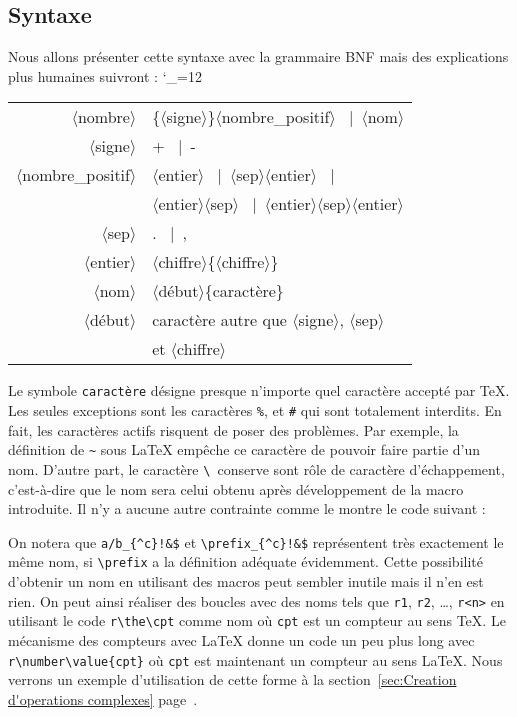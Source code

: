 \documentclass[12pt]{report}
\makeatletter
\newenvironment{syntaxBNF}{%
  \catcode`\_=12
  \def\*##1*{$\langle$##1$\rangle$}%
  \def\alt{\unskip~$|$~\ignorespaces}%
  \def\sameline{\multicolumn{1}{c}{} & \null\quad}%
  \ttfamily
  \begin{center}\begin{tabular}{r@{\quad:=\quad}l}}
{\end{tabular}\end{center}}
\makeatother
\begin{document}
\subsection{Syntaxe}
\label{subsec:Syntaxe}
Nous allons présenter cette syntaxe avec la grammaire BNF mais des
explications plus humaines suivront :
\begin{syntaxBNF}
  \*nombre* & \{\*signe*\}\*nombre_positif* \alt \*nom* \\
  \*signe* & + \alt - \\
  \*nombre_positif* & \*entier* \alt \*sep*\*entier* \alt \\
  \sameline \*entier*\*sep* \alt \*entier*\*sep*\*entier* \\
  \*sep* & . \alt , \\
  \*entier* & \*chiffre*\{\*chiffre*\} \\
  \*nom* & \*début*\{caractère\} \\
  \*début* & caractère \textnormal{autre que } \*signe*\textnormal{,}
  \*sep* \\
  \sameline \textnormal{et} \*chiffre*
\end{syntaxBNF}

Le symbole \texttt{caractère} désigne presque n'importe quel caractère
accepté par \TeX{}. Les seules exceptions sont les caractères \verb+%+,
et \verb+#+ qui sont totalement interdits. En fait, les caractères
actifs risquent de poser des problèmes. Par exemple, la définition de
\verb+~+ sous \LaTeX{} empêche ce caractère de pouvoir faire partie
d'un nom. D'autre part, le caractère \verb+\ +conserve sont rôle de
caractère d'échappement, c'est-à-dire que le nom sera celui obtenu
après développement de la macro introduite. Il n'y a aucune autre
contrainte comme le montre le code suivant :
\begin{SideBySideExample}
  \newcommand\prefix{a/b}
  \opprint{\prefix_{^c}!&$}
\end{SideBySideExample}
%
On notera que \verb+a/b_{^c}!&$+ et \verb+\prefix_{^c}!&$+
représentent très exactement le même nom, si \verb+\prefix+ a la
définition adéquate évidemment. Cette possibilité d'obtenir un nom en
utilisant des macros peut sembler inutile mais il n'en est rien. On
peut ainsi réaliser des boucles avec des noms tels que
\verb+r1+, \verb+r2+, \ldots, \verb+r<n>+ en utilisant le code
\verb+r\the\cpt+ comme nom où \verb+cpt+ est un compteur au sens
\TeX{}. Le mécanisme des compteurs avec \LaTeX{} donne un code un peu
plus long avec \verb+r\number\value{cpt}+ où \verb+cpt+ est maintenant
un compteur au sens \LaTeX. Nous verrons un exemple d'utilisation de
cette forme à la section~\ref{sec:Creation d'operations complexes}
page~\pageref{sec:Creation d'operations complexes}.
\end{document}
